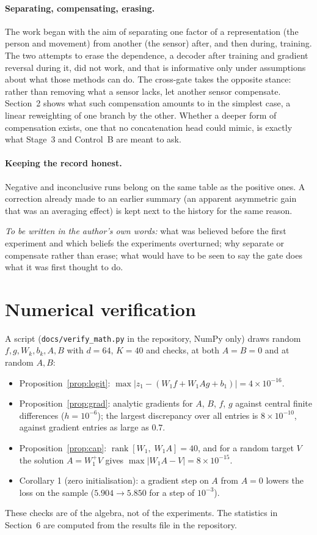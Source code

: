 \documentclass[11pt,a4paper]{article}
\theoremstyle{plain}
\theoremstyle{remark}
\DeclareMathOperator{\rank}{rank}
\begin{document}
\paragraph{Separating, compensating, erasing.} The work began with the aim of separating one factor of a representation (the person and movement) from another (the sensor) after, and then during, training. The two attempts to erase the dependence, a decoder after training and gradient reversal during it, did not work, and that is informative only under assumptions about what those methods can do. The cross-gate takes the opposite stance: rather than removing what a sensor lacks, let another sensor compensate. Section~2 shows what such compensation amounts to in the simplest case, a linear reweighting of one branch by the other. Whether a deeper form of compensation exists, one that no concatenation head could mimic, is exactly what Stage~3 and Control~B are meant to ask.

\paragraph{Keeping the record honest.} Negative and inconclusive runs belong on the same table as the positive ones. A correction already made to an earlier summary (an apparent asymmetric gain that was an averaging effect) is kept next to the history for the same reason.

\medskip
\noindent\emph{To be written in the author's own words:} what was believed before the first experiment and which beliefs the experiments overturned; why separate or compensate rather than erase; what would have to be seen to say the gate does what it was first thought to do.

\appendix
\section{Numerical verification}
A script (\texttt{docs/verify\_math.py} in the repository, NumPy only) draws random $f,g,W_k,b_k,A,B$ with $d=64$, $K=40$ and checks, at both $A=B=0$ and at random $A,B$:
\begin{itemize}
\item Proposition~\ref{prop:logit}: $\max|z_1-(W_1f+W_1Ag+b_1)|=4\times10^{-16}$.
\item Proposition~\ref{prop:grad}: analytic gradients for $A$, $B$, $f$, $g$ against central finite differences ($h=10^{-6}$); the largest discrepancy over all entries is $8\times10^{-10}$, against gradient entries as large as $0.7$.
\item Proposition~\ref{prop:cap}: $\rank[W_1,\;W_1A]=40$, and for a random target $V$ the solution $A=W_1^{+}V$ gives $\max|W_1A-V|=8\times10^{-15}$.
\item Corollary 1 (zero initialisation): a gradient step on $A$ from $A=0$ lowers the loss on the sample ($5.904\to5.850$ for a step of $10^{-3}$).
\end{itemize}
These checks are of the algebra, not of the experiments. The statistics in Section~6 are computed from the results file in the repository.
\end{document}

